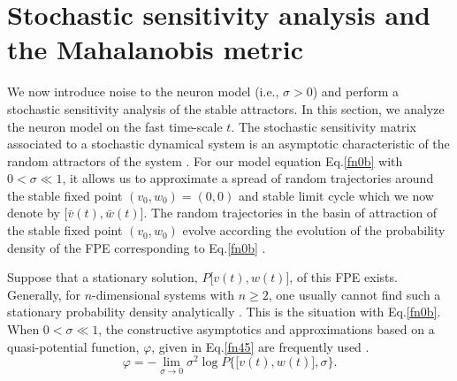 \section{Stochastic sensitivity analysis and the Mahalanobis metric}\label{sect4}
\noindent
We now introduce noise to the neuron model (i.e., $\sigma>0$) and
perform a stochastic sensitivity analysis of the stable
attractors. In this section, we analyze the neuron model on the
fast time-scale $t$. The stochastic sensitivity matrix
associated to a stochastic dynamical system is an asymptotic
characteristic of the random attractors of the system
\cite{Bashkirtseva1}. For our model equation Eq.\eqref{fn0b} with
$0<\sigma\ll1$, it allows us to approximate a spread of random
trajectories around the stable fixed point $(v_0,w_0)=(0,0)$ and
stable limit cycle which we now denote by
$\big[\bar{v}(t),\bar{w}(t)\big]$. 
The random trajectories in the basin of attraction of the stable fixed point $(v_0,w_0)$ 
evolve according the evolution of the probability density of 
the FPE corresponding to Eq.\eqref{fn0b} \cite{Risken}. 

Suppose that a stationary solution, $P\big[v(t),w(t)\big]$, of this FPE exists. Generally, for
$n$-dimensional systems with $n\geq2$, one usually cannot  find such a stationary probability density
analytically \cite{Risken}. This is the situation with
Eq.\eqref{fn0b}. When $0<\sigma\ll1$, the constructive asymptotics
and approximations based on a quasi-potential function, $\varphi$,
given in Eq.\eqref{fn45} are frequently used \cite{M.I Freidlin}.
\begin{equation}\label{fn45} \varphi=-\lim_{\sigma \rightarrow 0}\sigma^2\log
P\Big\{\big[v(t),w(t)\big],\sigma\Big\}.\end{equation}

